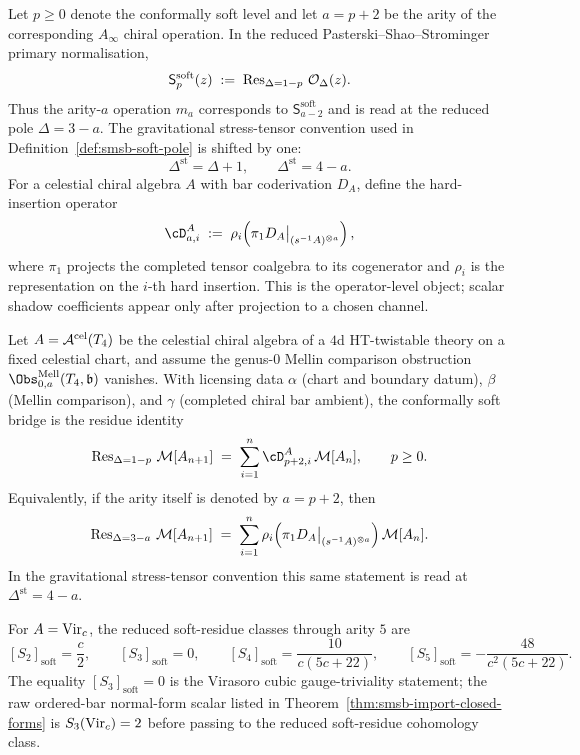 \begin{definition}
\label{def:smsb-residue-arity-coderivation}
\ClaimStatusProvedHere
Let $p \geq 0$ denote the conformally soft level and let
$a = p + 2$ be the arity of the corresponding $A_\infty$ chiral
operation. In the reduced Pasterski--Shao--Strominger primary
normalisation,
\[
 \mathsf S^{\mathrm{soft}}_{p}(z)
 \;:=\;
 \operatorname{Res}_{\Delta = 1-p}\,\mathcal O_\Delta(z).
\]
Thus the arity-$a$ operation $m_a$ corresponds to
$\mathsf S^{\mathrm{soft}}_{a-2}$ and is read at the reduced pole
$\Delta = 3-a$. The gravitational stress-tensor convention used in
Definition~\ref{def:smsb-soft-pole} is shifted by one:
\[
 \Delta^{\mathrm{st}} = \Delta + 1,
 \qquad
 \Delta^{\mathrm{st}} = 4-a.
\]
For a celestial chiral algebra $A$ with bar coderivation $D_A$, define
the hard-insertion operator
\[
 \cD^A_{a,i}
 \;:=\;
 \rho_i\!\left(
 \pi_1D_A\big|_{(s^{-1}A)^{\otimes a}}
 \right),
\]
where $\pi_1$ projects the completed tensor coalgebra to its
cogenerator and $\rho_i$ is the representation on the $i$-th hard
insertion. This is the operator-level object; scalar shadow
coefficients appear only after projection to a chosen channel.
\end{definition}

\begin{theorem}
\label{thm:smsb-mellin-residue-coderivation}
\ClaimStatusProvedHere
{}
Let $A=\mathcal A^{\mathrm{cel}}(T_4)$ be the celestial chiral algebra of a
$4$d HT-twistable theory on a fixed celestial chart, and assume the
genus-$0$ Mellin comparison obstruction
$\Obs^{\mathrm{Mell}}_{0,a}(T_4,\mathfrak b)$ vanishes. With
licensing data $\alpha$ (chart and boundary datum), $\beta$ (Mellin
comparison), and $\gamma$ (completed chiral bar ambient), the
conformally soft bridge is the residue identity
\begin{equation}
\label{eq:smsb-residue-soft-index}
 \Res_{\Delta = 1-p}\,\mathcal M[A_{n+1}]
 \;=\;
 \sum_{i=1}^{n}\cD^A_{p+2,i}\,\mathcal M[A_n],
 \qquad p \geq 0.
\end{equation}
Equivalently, if the arity itself is denoted by $a=p+2$, then
\begin{equation}
\label{eq:smsb-residue-arity-index}
 \operatorname{Res}_{\Delta = 3-a}\,\mathcal M[A_{n+1}]
 \;=\;
 \sum_{i=1}^{n}\rho_i\!\left(
 \pi_1D_A\big|_{(s^{-1}A)^{\otimes a}}
 \right)\mathcal M[A_n].
\end{equation}
In the gravitational stress-tensor convention this same statement is
read at $\Delta^{\mathrm{st}} = 4-a$.

For $A=\mathrm{Vir}_c$, the reduced soft-residue classes through arity $5$ are
\[
 [S_2]_{\mathrm{soft}}=\frac{c}{2},
 \qquad
 [S_3]_{\mathrm{soft}}=0,
 \qquad
 [S_4]_{\mathrm{soft}}=\frac{10}{c(5c+22)},
 \qquad
 [S_5]_{\mathrm{soft}}=-\frac{48}{c^2(5c+22)}.
\]
The equality $[S_3]_{\mathrm{soft}}=0$ is the Virasoro cubic
gauge-triviality statement; the raw ordered-bar normal-form scalar
listed in Theorem~\ref{thm:smsb-import-closed-forms} is
$S_3(\mathrm{Vir}_c)=2$ before passing to the reduced soft-residue cohomology
class.
\end{theorem}

